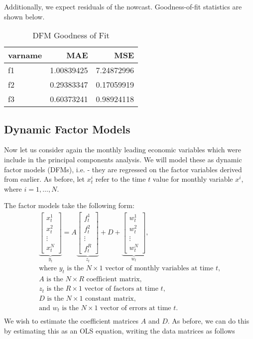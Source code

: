 \documentclass[11pt, letterpaper]{article}\usepackage[]{graphicx}\usepackage[]{color}
\begin{document}
Additionally, we expect residuals of the nowcast. Goodness-of-fit statistics are shown below.
\begin{table}[H]
\centering
\begingroup\footnotesize
\begin{tabular}{lrr}
  \hline
varname & MAE & MSE \\ 
  \hline
f1 & 1.00839425 & 7.24872996 \\ 
  f2 & 0.29383347 & 0.17059919 \\ 
  f3 & 0.60373241 & 0.98924118 \\ 
   \hline
\end{tabular}
\endgroup
\caption{DFM Goodness of Fit} 
\end{table}




\subsection{Dynamic Factor Models}
Now let us consider again the monthly leading economic variables which were include in the principal components analysis. We will model these as dynamic factor models (DFMs), i.e. - they are regressed on the factor variables derived from earlier. As before, let $x^i_t$ refer to the time $t$ value for monthly variable $x^i$, where $i = 1, \dots, N$.

The factor models take the following form:
\begin{align*}
\underbrace{\begin{bmatrix}
	x^1_t\\
	x^2_t\\
	\vdots \\
	x^N_t
\end{bmatrix}}_{y_t}
=
A
\underbrace{\begin{bmatrix}
	f^1_{t}\\
	f^2_{t}\\
	\vdots \\
	f^R_{t}
\end{bmatrix}}_{z_t}
+
D 
+
\underbrace{\begin{bmatrix}
	w^1_t\\
	w^2_t\\
	\vdots\\
	w^N_t
\end{bmatrix}}_{w_t},\\
\text{where $y_t$ is the $N \times 1$ vector of monthly variables at time $t$,}\\
\text{$A$ is the $N \times R$ coefficient matrix,}\\
\text{$z_t$ is the $R \times 1$ vector of factors at time $t$,}\\
\text{$D$ is the $N \times 1$ constant matrix,}\\
\text{and $w_t$ is the $N \times 1$ vector of errors at time $t$.}\\
\end{align*}
We wish to estimate the coefficient matrices $A$ and $D$. As before, we can do this by estimating this as an OLS equation, writing the data matrices as follows
\end{document}
